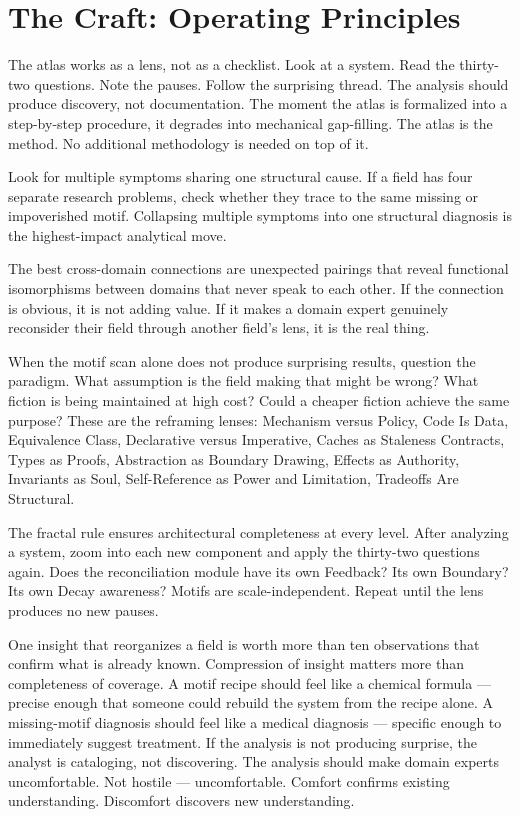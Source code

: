 \documentclass[11pt,a4paper]{article}
\begin{document}
\section{The Craft: Operating Principles}

The atlas works as a lens, not as a checklist. Look at a system. Read the thirty-two questions. Note the pauses. Follow the surprising thread. The analysis should produce discovery, not documentation. The moment the atlas is formalized into a step-by-step procedure, it degrades into mechanical gap-filling. The atlas is the method. No additional methodology is needed on top of it.

Look for multiple symptoms sharing one structural cause. If a field has four separate research problems, check whether they trace to the same missing or impoverished motif. Collapsing multiple symptoms into one structural diagnosis is the highest-impact analytical move.

The best cross-domain connections are unexpected pairings that reveal functional isomorphisms between domains that never speak to each other. If the connection is obvious, it is not adding value. If it makes a domain expert genuinely reconsider their field through another field's lens, it is the real thing.

When the motif scan alone does not produce surprising results, question the paradigm. What assumption is the field making that might be wrong? What fiction is being maintained at high cost? Could a cheaper fiction achieve the same purpose? These are the reframing lenses: Mechanism versus Policy, Code Is Data, Equivalence Class, Declarative versus Imperative, Caches as Staleness Contracts, Types as Proofs, Abstraction as Boundary Drawing, Effects as Authority, Invariants as Soul, Self-Reference as Power and Limitation, Tradeoffs Are Structural.

The fractal rule ensures architectural completeness at every level. After analyzing a system, zoom into each new component and apply the thirty-two questions again. Does the reconciliation module have its own Feedback? Its own Boundary? Its own Decay awareness? Motifs are scale-independent. Repeat until the lens produces no new pauses.

One insight that reorganizes a field is worth more than ten observations that confirm what is already known. Compression of insight matters more than completeness of coverage. A motif recipe should feel like a chemical formula --- precise enough that someone could rebuild the system from the recipe alone. A missing-motif diagnosis should feel like a medical diagnosis --- specific enough to immediately suggest treatment. If the analysis is not producing surprise, the analyst is cataloging, not discovering. The analysis should make domain experts uncomfortable. Not hostile --- uncomfortable. Comfort confirms existing understanding. Discomfort discovers new understanding.
\end{document}
